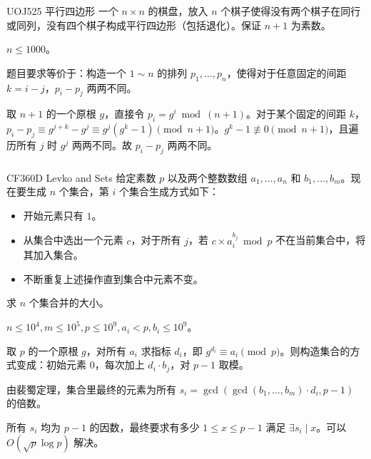 \documentclass[../main.tex]{subfiles}
\begin{document}
\subsubsection{}

\begin{frame}{UOJ525 平行四边形}
一个 $n\times n$ 的棋盘，放入 $n$ 个棋子使得没有两个棋子在同行或同列，没有四个棋子构成平行四边形（包括退化）。保证 $n+1$ 为素数。

$n\le 1000$。
\end{frame}

\begin{frame}
题目要求等价于：构造一个 $1\sim n$ 的排列 $p_1,\dots,p_n$，使得对于任意固定的间距 $k=i-j$，$p_i-p_j$ 两两不同。\pause

取 $n+1$ 的一个原根 $g$，直接令 $p_i=g^i\bmod (n+1)$。对于某个固定的间距 $k$，$p_{i}-p_j\equiv g^{j+k}-g^j\equiv g^j(g^k-1)\pmod {n+1}$。$g^k-1\not\equiv 0\pmod {n+1}$，且遍历所有 $j$ 时 $g^j$ 两两不同。故 $p_i-p_j$ 两两不同。
\end{frame}

\subsubsection{}

\begin{frame}{CF360D Levko and Sets}
给定素数 $p$ 以及两个整数数组 $a_1,\dots,a_n$ 和 $b_1,\dots,b_m$。现在要生成 $n$ 个集合，第 $i$ 个集合生成方式如下：

\begin{itemize}
\item 开始元素只有 $1$。
\item 从集合中选出一个元素 $c$，对于所有 $j$，若 $c\times a_i^{b_j}\bmod p$ 不在当前集合中，将其加入集合。
\item 不断重复上述操作直到集合中元素不变。
\end{itemize}

求 $n$ 个集合并的大小。

$n\le 10^4,m\le 10^5,p\le 10^9,a_i<p,b_i\le 10^9$。
\end{frame}

\begin{frame}
取 $p$ 的一个原根 $g$，对所有 $a_i$ 求指标 $d_i$，即 $g^{d_i}\equiv a_i\pmod p$。则构造集合的方式变成：初始元素 $0$，每次加上 $d_i\cdot b_j$，对 $p-1$ 取模。\pause

由裴蜀定理，集合里最终的元素为所有 $s_i=\gcd(\gcd(b_1,\dots,b_m)\cdot d_i,p-1)$ 的倍数。\pause

所有 $s_i$ 均为 $p-1$ 的因数，最终要求有多少 $1\le x\le p-1$ 满足 $\exists s_i\mid x$。可以 $O(\sqrt{p}\log p)$ 解决。
\end{frame}
\end{document}
